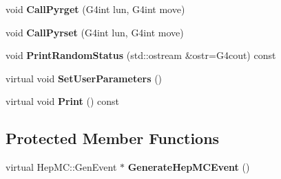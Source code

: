 \begin{DoxyCompactItemize}
\item 
\hypertarget{class_hep_m_c_g4_pythia_interface_ae61079ec925b5d7ba40bae6e8dda09ea}{}void {\bfseries Call\+Pyrget} (G4int lun, G4int move)\label{class_hep_m_c_g4_pythia_interface_ae61079ec925b5d7ba40bae6e8dda09ea}

\item 
\hypertarget{class_hep_m_c_g4_pythia_interface_a250ad0eb10834f554314fae10b454710}{}void {\bfseries Call\+Pyrset} (G4int lun, G4int move)\label{class_hep_m_c_g4_pythia_interface_a250ad0eb10834f554314fae10b454710}

\item 
\hypertarget{class_hep_m_c_g4_pythia_interface_abdb8a01a6157c91de6bff2177a4cf3fd}{}void {\bfseries Print\+Random\+Status} (std\+::ostream \&ostr=G4cout) const \label{class_hep_m_c_g4_pythia_interface_abdb8a01a6157c91de6bff2177a4cf3fd}

\item 
\hypertarget{class_hep_m_c_g4_pythia_interface_aa17ddba03c246a9f0011c31a3a601b24}{}virtual void {\bfseries Set\+User\+Parameters} ()\label{class_hep_m_c_g4_pythia_interface_aa17ddba03c246a9f0011c31a3a601b24}

\item 
\hypertarget{class_hep_m_c_g4_pythia_interface_a01e0ffc1f48ee73cde6f1a7af383db17}{}virtual void {\bfseries Print} () const \label{class_hep_m_c_g4_pythia_interface_a01e0ffc1f48ee73cde6f1a7af383db17}

\end{DoxyCompactItemize}
\subsection*{Protected Member Functions}
\begin{DoxyCompactItemize}
\item 
\hypertarget{class_hep_m_c_g4_pythia_interface_a35f96ffb6e7e846e1784321a87aa4859}{}virtual Hep\+M\+C\+::\+Gen\+Event $\ast$ {\bfseries Generate\+Hep\+M\+C\+Event} ()\label{class_hep_m_c_g4_pythia_interface_a35f96ffb6e7e846e1784321a87aa4859}

\end{DoxyCompactItemize}
